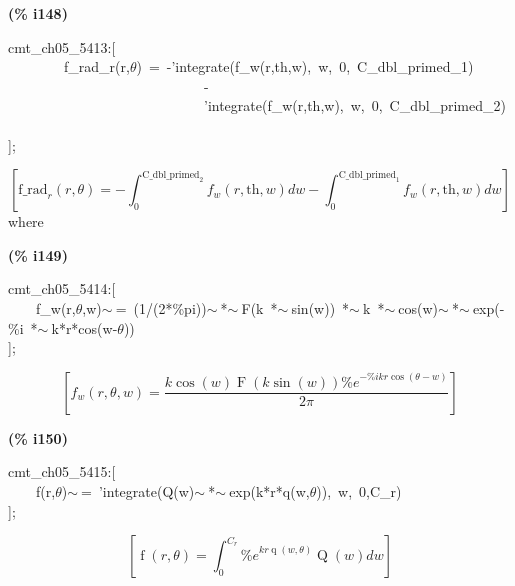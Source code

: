 \documentclass[fleqn]{article}
\begin{document}
\noindent
\begin{minipage}[t]{4.000000em}\color{red}\bfseries
(\% i148)	
\end{minipage}
\begin{minipage}[t]{\textwidth}\color{blue}
cmt\_ch05\_5413:[\\
\ \ \ \ \ \ \ \ f\_rad\_r(r,\ensuremath{\theta})\ =\ -'integrate(f\_w(r,th,w),\ w,\ 0,\ C\_dbl\_primed\_1)\\
\ \ \ \ \ \ \ \ \ \ \ \ \ \ \ \ \ \ \ \ \ \ \ \ \ \ \ \ -\\
\ \ \ \ \ \ \ \ \ \ \ \ \ \ \ \ \ \ \ \ \ \ \ \ \ \ \ \ 'integrate(f\_w(r,th,w),\ w,\ 0,\ C\_dbl\_primed\_2)\\
\\
];
\end{minipage}
\[\displaystyle \tag{\% o148} 
\left[ {{\ensuremath{\mathrm{f\_ rad}}}_r}\left( r\operatorname{,}\theta \right) =-\int_{0}^{{{\ensuremath{\mathrm{C\_ dbl\_ primed}}}_2}}{\left. {f_w}\left( r\operatorname{,}\ensuremath{\mathrm{th}}\operatorname{,}w\right) dw\right.}-\int_{0}^{{{\ensuremath{\mathrm{C\_ dbl\_ primed}}}_1}}{\left. {f_w}\left( r\operatorname{,}\ensuremath{\mathrm{th}}\operatorname{,}w\right) dw\right.}\right] \mbox{}
\]
where


\noindent
\begin{minipage}[t]{4.000000em}\color{red}\bfseries
(\% i149)	
\end{minipage}
\begin{minipage}[t]{\textwidth}\color{blue}
cmt\_ch05\_5414:[\\
\ \ \ \ f\_w(r,\ensuremath{\theta},w)\ensuremath{\sim\ }=\ (1/(2*\%pi))\ensuremath{\sim\ }*\ensuremath{\sim\ }F(k\ *\ensuremath{\sim\ }sin(w))\ *\ensuremath{\sim\ }k\ *\ensuremath{\sim\ }cos(w)\ensuremath{\sim\ }*\ensuremath{\sim\ }exp(-\%i\ *\ensuremath{\sim\ }k*r*cos(w-\ensuremath{\theta}))\\
];
\end{minipage}
\[\displaystyle \tag{\% o149} 
\left[ {f_w}\left( r\operatorname{,}\theta \operatorname{,}w\right) =\frac{k \cos{(w)} \operatorname{F}\left( k \sin{(w)}\right)  {{\% e}^{-\% i k r \cos{\left( \theta -w\right) }}}}{2 \ensuremath{\pi} }\right] \mbox{}
\]


\noindent
\begin{minipage}[t]{4.000000em}\color{red}\bfseries
(\% i150)	
\end{minipage}
\begin{minipage}[t]{\textwidth}\color{blue}
cmt\_ch05\_5415:[\\
\ \ \ \ f(r,\ensuremath{\theta})\ensuremath{\sim\ }=\ 'integrate(Q(w)\ensuremath{\sim\ }*\ensuremath{\sim\ }exp(k*r*q(w,\ensuremath{\theta})),\ w,\ 0,C\_r)\\
];
\end{minipage}
\[\displaystyle \tag{\% o150} 
\left[ \operatorname{f}\left( r\operatorname{,}\theta \right) =\int_{0}^{{C_r}}{\left. {{\% e}^{k r \operatorname{q}\left( w\operatorname{,}\theta \right) }} \operatorname{Q}(w)dw\right.}\right] \mbox{}
\]
\end{document}
